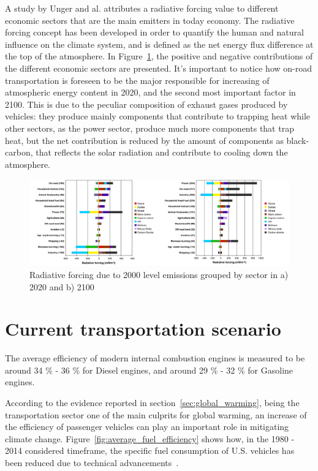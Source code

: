 \documentclass[12pt]{report}   %
\begin{document}
A study by Unger and al. \cite{Unger2010} attributes a radiative forcing value to different economic sectors that are the main emitters in today economy. The radiative forcing concept has been developed in order to quantify the human and natural influence on the climate system, and is defined as the net energy flux difference at the top of the atmosphere. In Figure~\ref{fig:radiative_forcing}, the positive and negative contributions of the different economic sectors are presented. It's important to notice how on-road transportation is foreseen to be the major responsible for increasing of atmospheric energy content in 2020, and the second most important factor in 2100. This is due to the peculiar composition of exhaust gases produced by vehicles: they produce mainly components that contribute to trapping heat while other sectors, as the power sector, produce much more components that trap heat, but the net contribution is reduced by the amount of components as black-carbon, that reflects the solar radiation and contribute to cooling down the atmosphere. 

\begin{figure}[ht]
  \centering
  \includegraphics[width=\textwidth]{figures/introduction/radiative_forcing.png}
  \caption{Radiative forcing due to 2000 level emissions grouped by sector in a) 2020 and b) 2100 \label{fig:radiative_forcing}}
\end{figure}

\section{Current transportation scenario}

The average efficiency of modern internal combustion engines is measured to be around 34 \% - 36 \% for Diesel engines, and around 29 \% - 32 \% for Gasoline engines.

According to the evidence reported in section~\ref{sec:global_warming}, being the transportation sector one of the main culprits for global warming, an increase of the efficiency of passenger vehicles can play an important role in mitigating climate change. Figure~\ref{fig:average_fuel_efficiency} shows how, in the 1980 - 2014 considered timeframe, the specific fuel consumption of U.S. vehicles has been reduced due to technical advancements~\cite{BureauofTransportationStatistics2016}.
\end{document}
